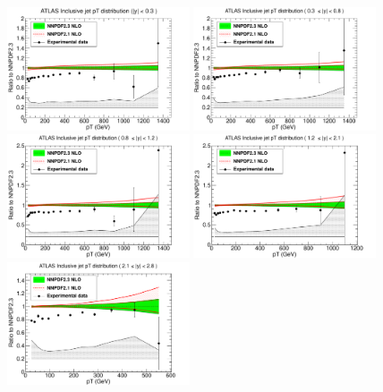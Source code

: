 \begin{figure}[hp]
\centering
\includegraphics[width=0.48\textwidth]{6-LHCimpact/figs/ATLASR04JETS36PB_0.pdf}
\includegraphics[width=0.48\textwidth]{6-LHCimpact/figs/ATLASR04JETS36PB_1.pdf}
\includegraphics[width=0.48\textwidth]{6-LHCimpact/figs/ATLASR04JETS36PB_2.pdf}
\includegraphics[width=0.48\textwidth]{6-LHCimpact/figs/ATLASR04JETS36PB_3.pdf}
\includegraphics[width=0.48\textwidth]{6-LHCimpact/figs/ATLASR04JETS36PB_4.pdf}

\end{figure}
